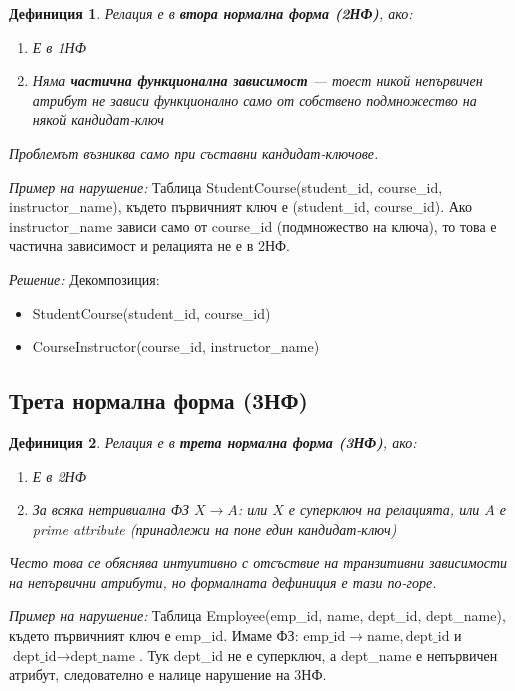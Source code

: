 \documentclass{scrartcl}
\newtheorem{definition}{Дефиниция}
\begin{document}
\begin{FlushLeft}
\begin{definition}
Релация е в \textbf{\textit{втора нормална форма (2НФ)}}, ако:
\begin{enumerate}
    \item Е в 1НФ
    \item Няма \textbf{\textit{частична функционална зависимост}} --- тоест никой непървичен атрибут не зависи функционално само от собствено подмножество на някой кандидат-ключ
\end{enumerate}

Проблемът възниква само при съставни кандидат-ключове.
\end{definition}

\textit{Пример на нарушение:} Таблица StudentCourse(student\_id, course\_id, instructor\_name), където първичният ключ е (student\_id, course\_id). Ако instructor\_name зависи само от course\_id (подмножество на ключа), то това е частична зависимост и релацията не е в 2НФ.

\textit{Решение:} Декомпозиция:
\begin{itemize}
    \item StudentCourse(student\_id, course\_id)
    \item CourseInstructor(course\_id, instructor\_name)
\end{itemize}

\subsection{Трета нормална форма (3НФ)}

\begin{definition}
Релация е в \textbf{\textit{трета нормална форма (3НФ)}}, ако:
\begin{enumerate}
    \item Е в 2НФ
    \item За всяка нетривиална ФЗ $X \rightarrow A$: или $X$ е суперключ на релацията, или $A$ е prime attribute (принадлежи на поне един кандидат-ключ)
\end{enumerate}

Често това се обяснява интуитивно с отсъствие на транзитивни зависимости на непървични атрибути, но формалната дефиниция е тази по-горе.
\end{definition}

\textit{Пример на нарушение:} Таблица Employee(emp\_id, name, dept\_id, dept\_name), където първичният ключ е emp\_id. Имаме ФЗ: $\text{emp\_id} \rightarrow \text{name}, \text{dept\_id}$ и $\text{dept\_id} \rightarrow \text{dept\_name}$. Тук dept\_id не е суперключ, а dept\_name е непървичен атрибут, следователно е налице нарушение на 3НФ.


\end{FlushLeft}
\end{document}

